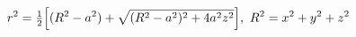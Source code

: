 \documentclass[preview]{standalone}
\begin{document}
\begin{align*}
\special{dvisvgm:raw <g id='unique000'>}r^2 = \tfrac12\Big[(R^2-a^2)+\sqrt{(R^2-a^2)^2+4a^2z^2}\Big],\ R^2=x^2+y^2+z^2\special{dvisvgm:raw </g>}
\end{align*}
\end{document}
